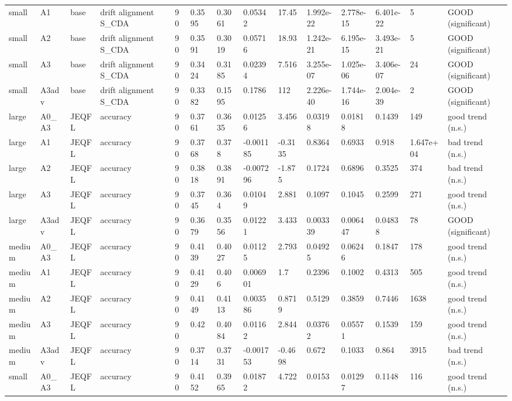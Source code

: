 \begin{table}[t]
\begin{tabular}{llllllllllllll}
small & A1 & base & drift alignment S\_CDA & 90 & 0.3595 & 0.3061 & 0.05342 & 17.45 & 1.992e-22 & 2.778e-15 & 6.401e-22 & 5 & GOOD (significant) \\
small & A2 & base & drift alignment S\_CDA & 90 & 0.3591 & 0.3019 & 0.05716 & 18.93 & 1.242e-21 & 6.195e-15 & 3.493e-21 & 5 & GOOD (significant) \\
small & A3 & base & drift alignment S\_CDA & 90 & 0.3424 & 0.3185 & 0.02394 & 7.516 & 3.255e-07 & 1.025e-06 & 3.406e-07 & 24 & GOOD (significant) \\
small & A3adv & base & drift alignment S\_CDA & 90 & 0.3382 & 0.1595 & 0.1786 & 112 & 2.226e-40 & 1.744e-16 & 2.004e-39 & 2 & GOOD (significant) \\
large & A0\_A3 & JEQFL & accuracy & 90 & 0.3761 & 0.3635 & 0.01256 & 3.456 & 0.03198 & 0.01818 & 0.1439 & 149 & good trend (n.s.) \\
large & A1 & JEQFL & accuracy & 90 & 0.3768 & 0.378 & -0.001185 & -0.3135 & 0.8364 & 0.6933 & 0.918 & 1.647e+04 & bad trend (n.s.) \\
large & A2 & JEQFL & accuracy & 90 & 0.3818 & 0.3891 & -0.007296 & -1.875 & 0.1724 & 0.6896 & 0.3525 & 374 & bad trend (n.s.) \\
large & A3 & JEQFL & accuracy & 90 & 0.3745 & 0.364 & 0.01049 & 2.881 & 0.1097 & 0.1045 & 0.2599 & 271 & good trend (n.s.) \\
large & A3adv & JEQFL & accuracy & 90 & 0.3679 & 0.3556 & 0.01221 & 3.433 & 0.003339 & 0.006447 & 0.04838 & 78 & GOOD (significant) \\
medium & A0\_A3 & JEQFL & accuracy & 90 & 0.4139 & 0.4027 & 0.01125 & 2.793 & 0.04925 & 0.06246 & 0.1847 & 178 & good trend (n.s.) \\
medium & A1 & JEQFL & accuracy & 90 & 0.4129 & 0.406 & 0.006901 & 1.7 & 0.2396 & 0.1002 & 0.4313 & 505 & good trend (n.s.) \\
medium & A2 & JEQFL & accuracy & 90 & 0.4149 & 0.4113 & 0.003586 & 0.8719 & 0.5129 & 0.3859 & 0.7446 & 1638 & good trend (n.s.) \\
medium & A3 & JEQFL & accuracy & 90 & 0.42 & 0.4084 & 0.01162 & 2.844 & 0.03762 & 0.05571 & 0.1539 & 159 & good trend (n.s.) \\
medium & A3adv & JEQFL & accuracy & 90 & 0.3714 & 0.3731 & -0.001753 & -0.4698 & 0.672 & 0.1033 & 0.864 & 3915 & bad trend (n.s.) \\
small & A0\_A3 & JEQFL & accuracy & 90 & 0.4152 & 0.3965 & 0.01872 & 4.722 & 0.0153 & 0.01297 & 0.1148 & 116 & good trend (n.s.) \\

\end{tabular}
\end{table}
